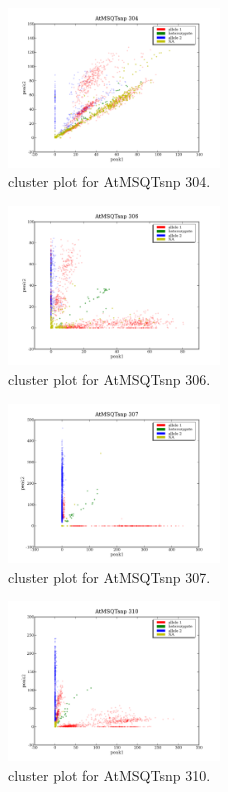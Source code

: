 \begin{figure}[H]
\includegraphics[width=0.5\textwidth]{figures/cluster_plot_AtMSQTsnp_304.png}
\caption{cluster plot for AtMSQTsnp 304.} \label{flAtMSQTsnp304}
\end{figure}

\begin{figure}[H]
\includegraphics[width=0.5\textwidth]{figures/cluster_plot_AtMSQTsnp_306.png}
\caption{cluster plot for AtMSQTsnp 306.} \label{flAtMSQTsnp306}
\end{figure}

\begin{figure}[H]
\includegraphics[width=0.5\textwidth]{figures/cluster_plot_AtMSQTsnp_307.png}
\caption{cluster plot for AtMSQTsnp 307.} \label{flAtMSQTsnp307}
\end{figure}

\begin{figure}[H]
\includegraphics[width=0.5\textwidth]{figures/cluster_plot_AtMSQTsnp_310.png}
\caption{cluster plot for AtMSQTsnp 310.} \label{flAtMSQTsnp310}
\end{figure}


